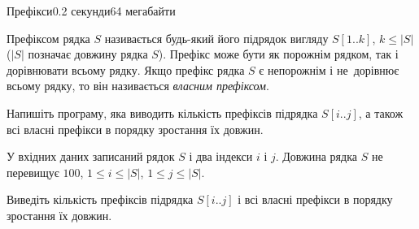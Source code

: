 \begin{problem}{Префікси}{}{}{0.2 секунди}{64 мегабайти}

Префіксом рядка $S$ називається будь-який його підрядок вигляду $S[1..k]$, $k \le |S|$ 
($|S|$ позначає довжину рядка $S$). 
Префікс може бути як порожнім рядком, так і дорівнювати всьому рядку.
Якщо префікс рядка $S$ є непорожнім і не~дорівнює всьому рядку, 
то він називається {\it власним префіксом}. 

Напишіть програму, яка виводить кількість префіксів підрядка $S[i..j]$, а також 
всі власні префікси в порядку зростання їх довжин.

\InputFile
У вхідних даних записаний рядок $S$ і два індекси $i$ і $j$. Довжина рядка $S$ не перевищує $100$, $1 \le i \le |S|$, $1 \le j \le |S|$.

\OutputFile
Виведіть кількість префіксів підрядка $S[i..j]$
і всі власні префікси в порядку зростання їх довжин.

\Examples

\begin{example}
%
%
\end{example}

\end{problem}

